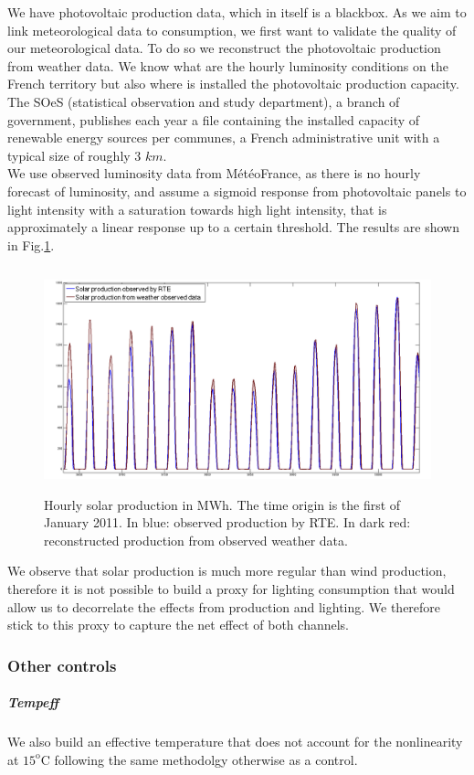 We have photovoltaic production data, which in itself is a blackbox. As we aim to link meteorological data to consumption, we first want to validate the quality of our meteorological data. To do so we reconstruct the photovoltaic production from weather data. We know what are the hourly luminosity conditions on the French territory but also where is installed the photovoltaic production capacity. The SOeS (statistical observation and study department), a branch of government, publishes each year a file containing the installed capacity of renewable energy sources per communes, a French administrative unit with a typical size of roughly 3 $km$. \\

We use observed luminosity data from M\'{e}t\'{e}oFrance, as there is no hourly forecast of luminosity, and assume a sigmoid response from photovoltaic panels to light intensity with a saturation towards high light intensity, that is approximately a linear response up to a certain threshold. The results are shown in Fig.\ref{solarreco}.  \\

\begin{figure}[!ht]
\centering
\includegraphics[height=65mm]{forqgis/solobs_reco.png} 
\caption{Hourly solar production in MWh. The time origin is the first of January 2011. In blue: observed production by RTE. In dark red: reconstructed production from observed weather data.}
\label{solarreco}
\end{figure}


We observe that solar production is much more regular than wind production, therefore it is not possible to build a proxy for lighting consumption that would allow us to decorrelate the effects from production and lighting. We therefore stick to this proxy to capture the net effect of both channels.

\subsubsection{Other controls}
\subparagraph{Tempeff}
We also build an effective temperature that does not account for the nonlinearity at $15^\text{o}$C following the same methodolgy otherwise as a control. 


